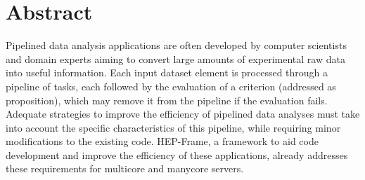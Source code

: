 \documentclass[
  twoside,
  11pt, a4paper,
  footinclude=true,
  headinclude=true,
  cleardoublepage=empty
]{scrbook}
\begin{document}

\author{José Pedro Moreira Resende}



\date{\myear} %



%


\ummetadata %

	\umfrontcover	
	\umtitlepage
	

	\chapter*{Abstract}

Pipelined data analysis applications are often developed by computer scientists and domain experts aiming to convert large amounts of experimental raw data into useful information.
Each input dataset element is processed through a pipeline of tasks, each followed by the evaluation of a criterion (addressed as proposition), which may remove it from the pipeline if the evaluation fails.
Adequate strategies to improve the efficiency of pipelined data analyses must take into account the specific characteristics of this pipeline, while requiring minor modifications to the existing code.
HEP-Frame, a framework to aid code development and improve the efficiency of these applications, already addresses these requirements for multicore and manycore servers.
\end{document}
